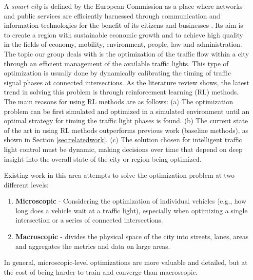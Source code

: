 \documentclass[a4paper,twoside]{article}
\begin{document}
A \textit{smart city} is defined by the European Commission as a place where networks and public services are efficiently harnessed through communication and information technologies for the benefit of its citizens and businesses \cite{EuropeanCommission2021}. Its aim is to create a region with sustainable economic growth and to achieve high quality in the fields of economy, mobility, environment, people, law and administration. 
The topic our group deals with is the optimization of the traffic flow within a city through an efficient management of the available traffic lights. This type of optimization is usually done by dynamically calibrating the timing of traffic signal phases at connected intersections.
As the literature review shows, the latest trend in solving this problem is through reinforcement learning (RL) methods. The main reasons for using RL methods are as follows:
(a) The optimization problem can be first simulated and optimized in a simulated environment until an optimal strategy for timing the traffic light phases is found.
(b) The current state of the art in using RL methods outperforms previous work (baseline methods), as shown in Section \ref{sec:relatedwork}.
(c) The solution chosen for intelligent traffic light control must be dynamic, making decisions over time that depend on deep insight into the overall state of the city or region being optimized.

Existing work in this area attempts to solve the optimization problem at two different levels:
\begin{enumerate}
	\item \textbf{Microscopic} - Considering the optimization of individual vehicles (e.g., how long does a vehicle wait at a traffic light), especially when optimizing a single intersection or a series of connected intersections. 
	\item \textbf{Macroscopic} - divides the physical space of the city into streets, lanes, areas and aggregates the metrics and data on large areas.
\end{enumerate}
In general, microscopic-level optimizations are more valuable and detailed, but at the cost of being harder to train and converge than macroscopic.
\end{document}
